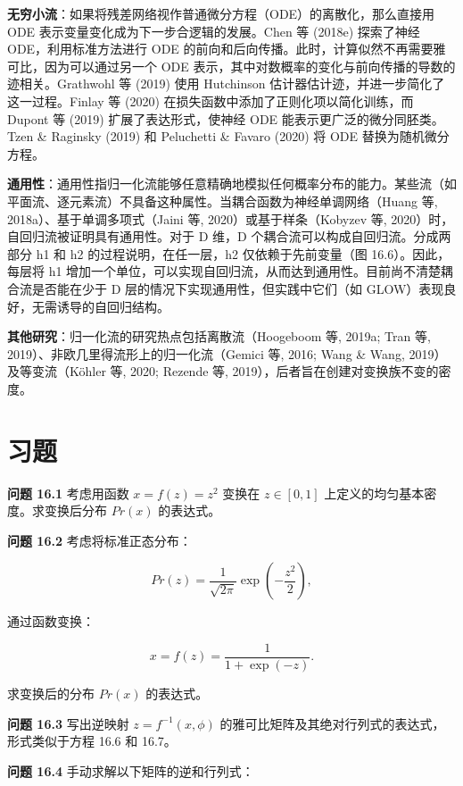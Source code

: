 \documentclass[lang=cn,newtx,10pt,scheme=chinese]{elegantbook}
\begin{document}
\textbf{无穷小流}：如果将残差网络视作普通微分方程（ODE）的离散化，那么直接用 ODE 表示变量变化成为下一步合逻辑的发展。Chen 等 (2018e) 探索了神经 ODE，利用标准方法进行 ODE 的前向和后向传播。此时，计算似然不再需要雅可比，因为可以通过另一个 ODE 表示，其中对数概率的变化与前向传播的导数的迹相关。Grathwohl 等 (2019) 使用 Hutchinson 估计器估计迹，并进一步简化了这一过程。Finlay 等 (2020) 在损失函数中添加了正则化项以简化训练，而 Dupont 等 (2019) 扩展了表达形式，使神经 ODE 能表示更广泛的微分同胚类。Tzen \& Raginsky (2019) 和 Peluchetti \& Favaro (2020) 将 ODE 替换为随机微分方程。

\textbf{通用性}：通用性指归一化流能够任意精确地模拟任何概率分布的能力。某些流（如平面流、逐元素流）不具备这种属性。当耦合函数为神经单调网络（Huang 等, 2018a）、基于单调多项式（Jaini 等, 2020）或基于样条（Kobyzev 等, 2020）时，自回归流被证明具有通用性。对于 D 维，D 个耦合流可以构成自回归流。分成两部分 h1 和 h2 的过程说明，在任一层，h2 仅依赖于先前变量（图 16.6）。因此，每层将 h1 增加一个单位，可以实现自回归流，从而达到通用性。目前尚不清楚耦合流是否能在少于 D 层的情况下实现通用性，但实践中它们（如 GLOW）表现良好，无需诱导的自回归结构。

\textbf{其他研究}：归一化流的研究热点包括离散流（Hoogeboom 等, 2019a; Tran 等, 2019）、非欧几里得流形上的归一化流（Gemici 等, 2016; Wang \& Wang, 2019）及等变流（Köhler 等, 2020; Rezende 等, 2019），后者旨在创建对变换族不变的密度。

\section{习题}
\textbf{问题 16.1} 考虑用函数 \(x = f(z) = z^2\) 变换在 \(z \in [0, 1]\) 上定义的均匀基本密度。求变换后分布 \(Pr(x)\) 的表达式。

\textbf{问题 16.2} 考虑将标准正态分布：

\begin{equation}
Pr(z) = \frac{1}{\sqrt{2\pi}} \exp\left(-\frac{z^2}{2}\right), 
\end{equation}

通过函数变换：

\begin{equation}
x = f(z) = \frac{1}{1 + \exp(-z)}. 
\end{equation}

求变换后的分布 \(Pr(x)\) 的表达式。

\textbf{问题 16.3} 写出逆映射 \(z = f^{-1}(x, \phi)\) 的雅可比矩阵及其绝对行列式的表达式，形式类似于方程 16.6 和 16.7。

\textbf{问题 16.4} 手动求解以下矩阵的逆和行列式：
\end{document}
